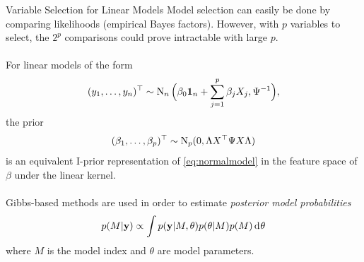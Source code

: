\documentclass{beamer}
\newlength{\onecolwid}
\begin{document}
\begin{frame}[t]
\begin{columns}[t]
\begin{column}{\onecolwid}
\vspace{1mm}
\begin{block}{Variable Selection for Linear Models}
Model selection can easily be done by comparing likelihoods (empirical Bayes factors). However, with $p$ variables to select, the $2^p$ comparisons could prove intractable with large $p$.
\\~\\[-0.8ex]
For linear models of the form
\[
  (y_1,\dots,y_n)^\top \sim \operatorname{N}_n \Big( \beta_0{\mathbf 1}_n + \sum_{j=1}^p \beta_j X_j, \Psi^{-1} \Big),
\]
\vspace{-8pt}
the prior
\vspace{-8pt}
\[
  (\beta_1,\dots,\beta_p)^\top \sim \operatorname{N}_p(0, \Lambda X^\top \Psi X \Lambda)
\]
is an equivalent I-prior representation of \eqref{eq:normalmodel} in the feature space of $\beta$ under the linear kernel. 
\\~\\[-0.8ex]
Gibbs-based methods are used in order to estimate \emph{posterior model probabilities}
\[
  p(M | {\mathbf y}) \propto \int p({\mathbf y}|M, \theta) p(\theta|M) p(M) \operatorname{d\!\:\!}\theta
\]
where $M$ is the model index and $\theta$ are model parameters.
\\~\\[-0.8ex]


\end{block}
\end{column}
\end{columns}
\end{frame}
\end{document}
